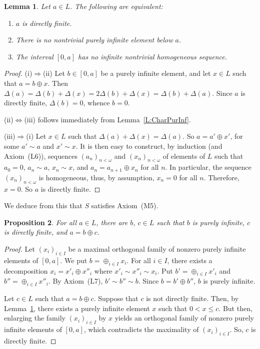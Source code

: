 \documentclass[psamsfonts,reqno]{memo-l}
\theoremstyle{plain}
\newtheorem{lemma}{Lemma}[section]
\newtheorem{proposition}[lemma]{Proposition}
\theoremstyle{definition}
\theoremstyle{remark}
\numberwithin{equation}{section}
\newcommand{\DD}{\Delta}
\newcommand{\famm}[2]{(#1)_{#2}}
\begin{document}
\begin{lemma}\label{L:CharDf}
Let $a\in L$. The following are equivalent:
\begin{enumerate}
\item $a$ is directly finite.

\item There is no nontrivial purely infinite element below $a$.

\item The interval $[0,a]$ has no infinite nontrivial homogeneous sequence.
\end{enumerate}
\end{lemma}

\begin{proof}
(i)$\Rightarrow$(ii)
Let $b\in[0,a]$ be a purely infinite element, and let $x\in L$ such that
$a=b\oplus x$. Then $\DD(a)=\DD(b)+\DD(x)=2\DD(b)+\DD(x)=\DD(b)+\DD(a)$.
Since $a$ is directly finite, $\DD(b)=0$, whence
$b=0$.

(ii)$\Leftrightarrow$(iii) follows immediately from Lemma~\ref{L:CharPurInf}.

(iii)$\Rightarrow$(i)
Let $x\in L$ such that $\DD(a)+\DD(x)=\DD(a)$. So $a=a'\oplus x'$, for some
$a'\sim a$ and $x'\sim x$. It is then easy to construct, by induction (and
Axiom~(L6)), sequences $\famm{a_n}{n<\omega}$ and $\famm{x_n}{n<\omega}$
of elements of $L$ such that $a_0=0$, $a_n\sim a$, $x_n\sim x$,
and $a_n=a_{n+1}\oplus x_n$ for all $n$. In particular, the sequence
$\famm{x_n}{n<\omega}$ is homogeneous, thus, by assumption, $x_n=0$ for all
$n$. Therefore, $x=0$. So $a$ is directly finite.
\end{proof}

We deduce from this that $S$ satisfies Axiom~(M5).

\begin{proposition}\label{P:DfPiDec}
For all $a\in L$, there are $b$, $c\in L$ such that $b$ is
purely infinite, $c$ is directly finite, and
$a=b\oplus c$.
\end{proposition}

\begin{proof}
Let $\famm{x_i}{i\in I}$ be a maximal orthogonal family of nonzero purely
infinite elements of $[0,a]$. We put $b=\oplus_{i\in I}x_i$. For all
$i\in I$, there exists a decomposition $x_i=x'_i\oplus x''_i$ where
$x'_i\sim x''_i\sim x_i$. Put $b'=\oplus_{i\in I}x'_i$ and
$b''=\oplus_{i\in I}x''_i$. By Axiom~(L7), $b'\sim b''\sim b$. Since
$b=b'\oplus b''$, $b$ is purely infinite.

Let $c\in L$ such that $a=b\oplus c$. Suppose that $c$ is
not directly finite. Then, by Lemma~\ref{L:CharDf},
there exists a purely infinite element $x$ such that $0<x\leq c$. But then,
enlarging the family
$\famm{x_i}{i\in I}$ by $x$ yields an orthogonal family of nonzero purely
infinite elements of
$[0,a]$, which contradicts the maximality of $\famm{x_i}{i\in I}$.
So, $c$ is directly finite.
\end{proof}
\end{document}
